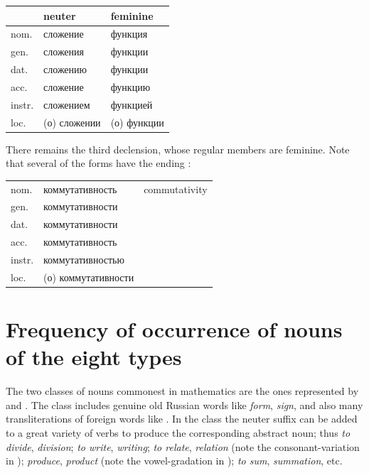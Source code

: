 \begin{center}
\small
\begin{tabular}{@{}l >{\cyrillicfont}l >{\cyrillicfont}l@{}}
\toprule
& neuter & feminine\\
\midrule
nom. & сложение & функция\\
gen. & сложения & функции\\
dat. & сложению & функции\\
acc. & сложение & функцию\\
instr. & сложением & функцией\\
loc. & (о) сложении & (о) функции\\
\bottomrule
\end{tabular}
\end{center}

There remains the third declension, whose regular members are feminine. Note that several of the forms have the ending :

\begin{center}
\small
\begin{tabular}{@{}l >{\cyrillicfont}l l@{}}
nom. & коммутативность & commutativity\\
gen. & коммутативности & \\
dat. & коммутативности & \\
acc. & коммутативность & \\
instr. & коммутативностью & \\
loc. & (о) коммутативности & \\
\end{tabular}
\end{center}


\section{Frequency of occurrence of nouns of the eight types}

The two classes of nouns commonest in mathematics are the ones represented by  and . The  class includes genuine old Russian words like  \emph{form},  \emph{sign}, and also many transliterations of foreign words like . In the  class the neuter suffix  can be added to a great variety of verbs to produce the corresponding abstract noun; thus  \emph{to divide},  \emph{division};  \emph{to write},  \emph{writing};  \emph{to relate},  \emph{relation} (note the consonant-variation in );  \emph{produce},  \emph{product} (note the vowel-gradation in );  \emph{to sum},  \emph{summation}, etc.


